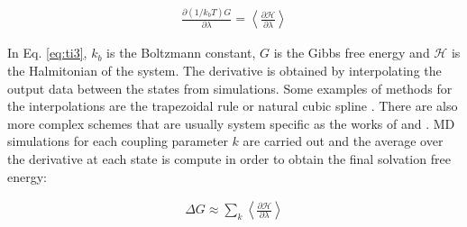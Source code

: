 

\begin{equation}
\label{eq:ti3}
\begin{aligned}
\frac{\partial (1/k_{b}T) G}{\partial \lambda} =  \left \langle \frac{\partial \mathcal{H}}{\partial \lambda} \right \rangle 
\end{aligned}
\end{equation}

In Eq. \eqref{eq:ti3}, $k_{b}$ is the Boltzmann constant, $G$ is the Gibbs free energy and $\mathcal{H}$ is the Halmitonian of the system. The derivative is obtained by interpolating the output data between the states from simulations. Some examples of methods for the interpolations are the trapezoidal rule or natural cubic spline \cite{bareva}. There are also more complex schemes that are usually system specific as the works of  and . MD simulations for each coupling parameter $k$ are carried out and the average over the derivative at each state is compute in order to obtain the final solvation free energy:

\begin{equation}
\label{eq:ti4}
\begin{aligned}
\Delta G \approx \sum _{k}  \left \langle \frac{\partial \mathcal{H}}{\partial \lambda} \right \rangle 
\end{aligned}
\end{equation}

